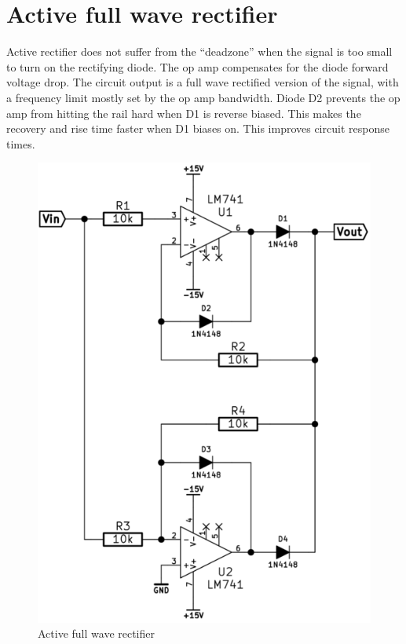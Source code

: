 \documentclass[]{article}
\begin{document}
\section{Active full wave rectifier}\label{active-full-wave-rectifier}

Active rectifier does not suffer from the ``deadzone'' when the signal
is too small to turn on the rectifying diode. The op amp compensates for
the diode forward voltage drop. The circuit output is a full wave
rectified version of the signal, with a frequency limit mostly set by
the op amp bandwidth. Diode D2 prevents the op amp from hitting the rail
hard when D1 is reverse biased. This makes the recovery and rise time
faster when D1 biases on. This improves circuit response times.

\begin{figure}[htbp]
\centering
\includegraphics{img/fwr.png}
\caption{Active full wave rectifier}
\end{figure}
\end{document}
